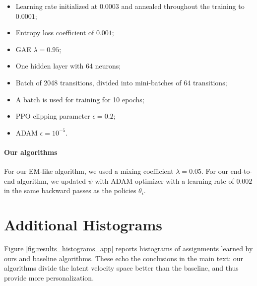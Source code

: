 \begin{itemize}
    \item Learning rate initialized at $0.0003$ and annealed throughout the training to $0.0001$;
    \item Entropy loss coefficient of $0.001$;
    \item GAE $\lambda = 0.95$;
    \item One hidden layer with 64 neurons;
    \item Batch of 2048 transitions, divided into mini-batches of 64 transitions;
    \item A batch is used for training for 10 epochs;
    \item PPO clipping parameter $\epsilon = 0.2$;
    \item ADAM $\epsilon = 10^{-5}$.
\end{itemize}

\paragraph{Our algorithms}

For our EM-like algorithm, we used a mixing coefficient $\lambda = 0.05$. For our end-to-end algorithm, we updated $\psi$ with ADAM optimizer with a learning rate of $0.002$ in the same backward passes as the policies $\theta_i$.



\section{Additional Histograms}


Figure \ref{fig:results_histograms_app} reports histograms of assignments learned by ours and baseline algorithms. These echo the conclusions in the main text: our algorithms divide the latent velocity space better than the baseline, and thus provide more personalization.


